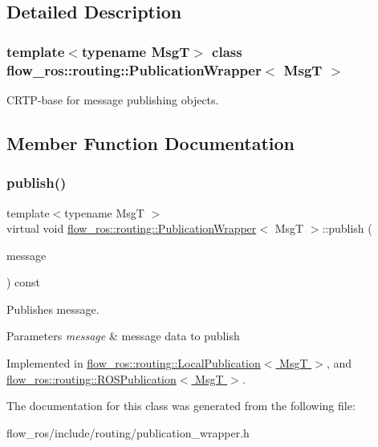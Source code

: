 \subsection{Detailed Description}
\subsubsection*{template$<$typename MsgT$>$\newline
class flow\+\_\+ros\+::routing\+::\+Publication\+Wrapper$<$ Msg\+T $>$}

C\+R\+T\+P-\/base for message publishing objects. 

\subsection{Member Function Documentation}
\mbox{\label{classflow__ros_1_1routing_1_1_publication_wrapper_a43b9989390bf9f001fe9670a0c1d5897}} 
\subsubsection{\texorpdfstring{publish()}{publish()}}
{\footnotesize\ttfamily template$<$typename MsgT $>$ \\
virtual void \hyperlink{classflow__ros_1_1routing_1_1_publication_wrapper}{flow\+\_\+ros\+::routing\+::\+Publication\+Wrapper}$<$ MsgT $>$\+::publish (\begin{DoxyParamCaption}\item[{const \hyperlink{namespaceflow__ros_a21a684f38ee2083b3858613317c46d82}{message\+\_\+shared\+\_\+ptr\+\_\+t}$<$ MsgT $>$ \&}]{message }\end{DoxyParamCaption}) const\hspace{0.3cm}{\ttfamily [pure virtual]}}



Publishes message. 


\begin{DoxyParams}{Parameters}
{\em message} & message data to publish \\
\hline
\end{DoxyParams}


Implemented in \hyperlink{classflow__ros_1_1routing_1_1_local_publication_ab2d53a2bd93e83ee11095f35d5820226}{flow\+\_\+ros\+::routing\+::\+Local\+Publication$<$ Msg\+T $>$}, and \hyperlink{classflow__ros_1_1routing_1_1_r_o_s_publication_a1ad3cf68c465a909399bb4496e561f0b}{flow\+\_\+ros\+::routing\+::\+R\+O\+S\+Publication$<$ Msg\+T $>$}.



The documentation for this class was generated from the following file\+:\begin{DoxyCompactItemize}
\item 
flow\+\_\+ros/include/routing/publication\+\_\+wrapper.\+h\end{DoxyCompactItemize}

